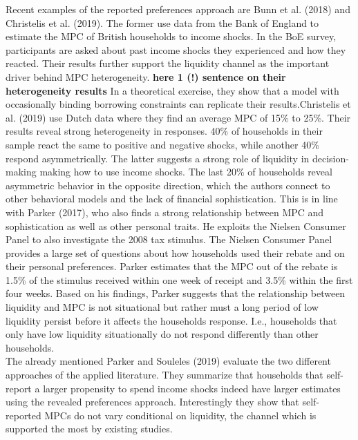 Recent examples of the reported preferences approach are Bunn et al. (2018) and Christelis et al. (2019). The former use data from the Bank of England to estimate the MPC of British households to income shocks. In the BoE survey, participants are asked about past income shocks they experienced and how they reacted. Their results further support the liquidity channel as the important driver behind MPC heterogeneity. \textbf{here 1 (!) sentence on their heterogeneity results} In a theoretical exercise, they show that a model with occasionally binding borrowing constraints can replicate their results.Christelis et al. (2019) use Dutch data where they find an average MPC of 15\% to 25\%. Their results reveal strong heterogeneity in responses. 40\% of households in their sample react the same to positive and negative shocks, while another 40\% respond asymmetrically. The latter suggests a strong role of liquidity in decision-making making how to use income shocks. The last 20\% of households reveal asymmetric behavior in the opposite direction, which the authors connect to other behavioral models and the lack of financial sophistication. This is in line with Parker (2017), who also finds a strong relationship between MPC and sophistication as well as other personal traits. He exploits the Nielsen Consumer Panel to also investigate the 2008 tax stimulus. The Nielsen Consumer Panel provides a large set of questions about how households used their rebate and on their personal preferences. Parker estimates that the MPC out of the rebate is 1.5\% of the stimulus received within one week of receipt and 3.5\% within the first four weeks. Based on his findings, Parker suggests that the relationship between liquidity and MPC is not situational but rather must a long period of low liquidity persist before it affects the households response. I.e., households that only have low liquidity situationally do not respond differently than other households. \\
The already mentioned Parker and Souleles (2019) evaluate the two different approaches of the applied literature. They summarize that households that self-report a larger propensity to spend income shocks indeed have larger estimates using the revealed preferences approach. Interestingly they show that self-reported MPCs do not vary conditional on liquidity, the channel which is supported the most by existing studies. \\
